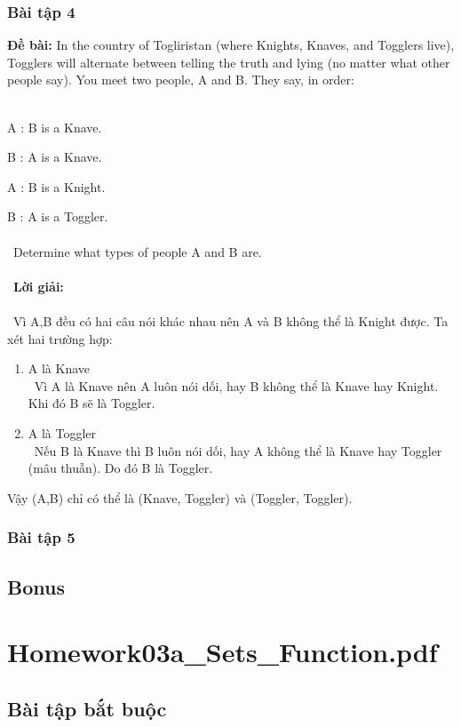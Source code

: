 \documentclass[a4paper]{article}
\begin{document}
\clearpage
\subsubsection{Bài tập 4}
\textbf{Đề bài:} In the country of Togliristan (where Knights, Knaves, and Togglers live), Togglers will alternate between telling the truth and lying (no matter what other people say). You meet two people, A and B. They say, in order: \\\

A : B is a Knave. 

B : A is a Knave.

A : B is a Knight.

B : A is a Toggler.\\\ \\\
Determine what types of people A and B are. \\\ \\\
\textbf{Lời giải:} \\\ \\\
Vì A,B đều có hai câu nói khác nhau nên A và B không thể là Knight được. Ta xét hai trường hợp: 
\begin{enumerate}
\item A là Knave \\\
Vì A là Knave nên A luôn nói dối, hay B không thể là Knave hay Knight. Khi đó B sẽ là Toggler.
\item A là Toggler \\\
Nếu B là Knave thì B luôn nói dối, hay A không thể là Knave hay Toggler (mâu thuẫn). Do đó B là Toggler.
\end{enumerate}
Vậy (A,B) chỉ có thể là (Knave, Toggler) và (Toggler, Toggler).

\clearpage
\subsubsection{Bài tập 5}

\clearpage
\subsection{Bonus}
\clearpage

\section{Homework03a\_Sets\_Function.pdf}
\subsection{Bài tập bắt buộc}
\end{document}
